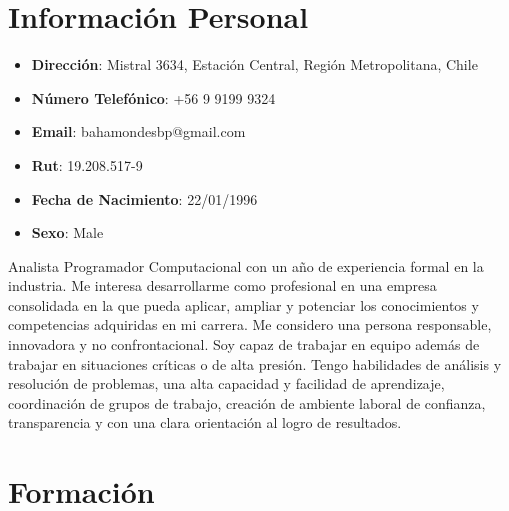 \documentclass[11pt,a4paper,roman]{moderncv}        %
\begin{document}
\makecvtitle
\vspace*{-10mm}

\section{Información Personal}

\begin{itemize}

\item{\textbf{Dirección}: Mistral 3634, Estación Central, Región Metropolitana, Chile}

\item{\textbf{Número Telefónico}: +56 9 9199 9324}

\item{\textbf{Email}: bahamondesbp@gmail.com}

\item{\textbf{Rut}: 19.208.517-9}

\item{\textbf{Fecha de Nacimiento}: 22/01/1996}

\item{\textbf{Sexo}: Male}\\

\end{itemize}

\small{ Analista Programador Computacional con un año de experiencia formal en la industria. Me interesa desarrollarme como profesional en una
empresa consolidada en la que pueda aplicar, ampliar y potenciar los conocimientos y competencias adquiridas en mi carrera. Me considero una
persona responsable, innovadora y no confrontacional. Soy capaz de trabajar en equipo además de trabajar en situaciones críticas o de alta presión.
Tengo habilidades de análisis y resolución de problemas, una alta capacidad y facilidad de aprendizaje, coordinación de grupos de trabajo, creación
de ambiente laboral de confianza, transparencia y con una clara orientación al logro de resultados.}

\section{Formación}

\vspace{3pt}
\end{document}
